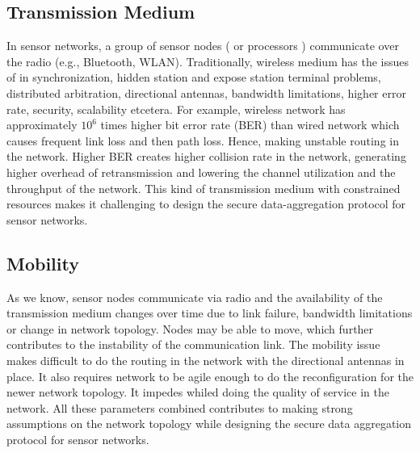 	\subsection{Transmission Medium}
		In sensor networks, a group of sensor nodes ( or processors ) communicate over the radio (e.g., Bluetooth, WLAN).
		Traditionally, wireless medium has the issues of in synchronization, hidden station and expose station terminal problems, distributed arbitration, directional antennas, bandwidth limitations, higher error rate, security, scalability etcetera.
		For example, wireless network has approximately $10^6$ times higher bit error rate (BER) than wired network which causes frequent link loss and then path loss. 
		Hence, making unstable routing in the network.
		Higher BER creates higher collision rate in the network, generating higher overhead of retransmission and lowering the channel utilization and the throughput of the network.
		This kind of transmission medium with constrained resources makes it challenging to design the secure data-aggregation protocol for sensor networks.

	\subsection{Mobility}
		As we know, sensor nodes communicate via radio and the availability of the transmission medium changes over time due to link failure, bandwidth limitations or change in network topology.
		Nodes may be able to move, which further contributes to the instability of the communication link.
		The mobility issue makes difficult to do the routing in the network with the directional antennas in place.
		It also requires network to be agile enough to do the reconfiguration for the newer network topology.
		It impedes whiled doing the quality of service in the network. 
		All these parameters combined contributes to making strong assumptions on the network topology while designing the secure data aggregation protocol for sensor networks.

